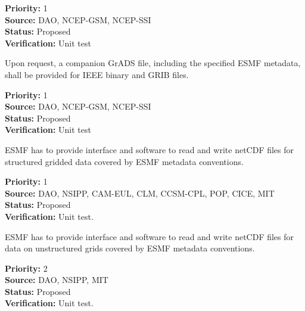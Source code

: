\begin{reqlist}
{\bf Priority:} 1 \\
{\bf Source:} DAO, NCEP-GSM, NCEP-SSI \\
{\bf Status:} Proposed \\
{\bf Verification:} Unit test \\
\end{reqlist}


Upon request, a companion GrADS file, including the specified ESMF
metadata, shall be provided for IEEE binary and GRIB files.

\begin{reqlist}
{\bf Priority:} 1 \\
{\bf Source:} DAO, NCEP-GSM, NCEP-SSI \\
{\bf Status:} Proposed \\
{\bf Verification:} Unit test \\
\end{reqlist}






ESMF has to provide interface and software to read and write netCDF
files for structured gridded data covered by ESMF metadata conventions. 

\begin{reqlist}
{\bf Priority:} 1 \\
{\bf Source:} DAO, NSIPP, CAM-EUL, CLM, CCSM-CPL, POP, CICE, MIT \\
{\bf Status:} Proposed \\
{\bf Verification:} Unit test. \\
\end{reqlist}



ESMF has to provide interface and software to read and write netCDF
files for data on unstructured grids covered by ESMF metadata conventions. 

\begin{reqlist}
{\bf Priority:} 2 \\
{\bf Source:} DAO, NSIPP, MIT \\
{\bf Status:} Proposed \\
{\bf Verification:} Unit test. \\
\end{reqlist}


